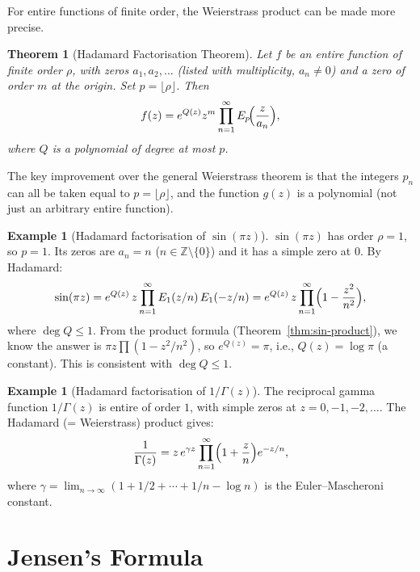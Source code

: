 \documentclass[12pt,a4paper,openany]{book}
\theoremstyle{definition}
\newtheorem{example}[definition]{Example}
\theoremstyle{plain}
\newtheorem{theorem}[definition]{Theorem}
\theoremstyle{remark}
\newcommand{\Z}{\mathbb{Z}}
\begin{document}
For entire functions of finite order, the Weierstrass product can be
made more precise.

\begin{theorem}[Hadamard Factorisation Theorem]\label{thm:hadamard}
Let $f$ be an entire function of finite order $\rho$, with zeros
$a_1, a_2, \ldots$ (listed with multiplicity, $a_n \neq 0$) and a
zero of order $m$ at the origin. Set $p = \lfloor \rho \rfloor$. Then
\begin{equation}\label{eq:hadamard}
  f(z) = e^{Q(z)} z^m \prod_{n=1}^{\infty} E_p\!\Bigl(\frac{z}{a_n}\Bigr),
\end{equation}
where $Q$ is a polynomial of degree at most $p$.
\end{theorem}

The key improvement over the general Weierstrass theorem is that the
integers $p_n$ can all be taken equal to $p = \lfloor\rho\rfloor$, and
the function $g(z)$ is a polynomial (not just an arbitrary entire function).

\begin{example}[Hadamard factorisation of $\sin(\pi z)$]\label{ex:hadamard-sin}
$\sin(\pi z)$ has order $\rho = 1$, so $p = 1$. Its zeros are
$a_n = n$ ($n \in \Z \setminus \{0\}$) and it has a simple zero at $0$.
By Hadamard:
\[
  \sin(\pi z) = e^{Q(z)}\, z \prod_{n=1}^{\infty}E_1(z/n)\, E_1(-z/n)
  = e^{Q(z)}\, z\prod_{n=1}^{\infty}\Bigl(1-\frac{z^2}{n^2}\Bigr),
\]
where $\deg Q \leq 1$. From the product formula (Theorem~\ref{thm:sin-product}),
we know the answer is $\pi z \prod(1-z^2/n^2)$, so $e^{Q(z)} = \pi$,
i.e., $Q(z) = \log\pi$ (a constant). This is consistent with $\deg Q \leq 1$.
\end{example}

\begin{example}[Hadamard factorisation of $1/\Gamma(z)$]\label{ex:hadamard-gamma}
The reciprocal gamma function $1/\Gamma(z)$ is entire of order $1$, with
simple zeros at $z = 0, -1, -2, \ldots$. The Hadamard (= Weierstrass) product gives:
\[
  \frac{1}{\Gamma(z)} = z\, e^{\gamma z}\prod_{n=1}^{\infty}
  \Bigl(1 + \frac{z}{n}\Bigr)e^{-z/n},
\]
where $\gamma = \lim_{n\to\infty}(1+1/2+\cdots+1/n - \log n)$ is the
Euler--Mascheroni constant.
\end{example}

\section{Jensen's Formula}\label{sec:jensen}
\end{document}
